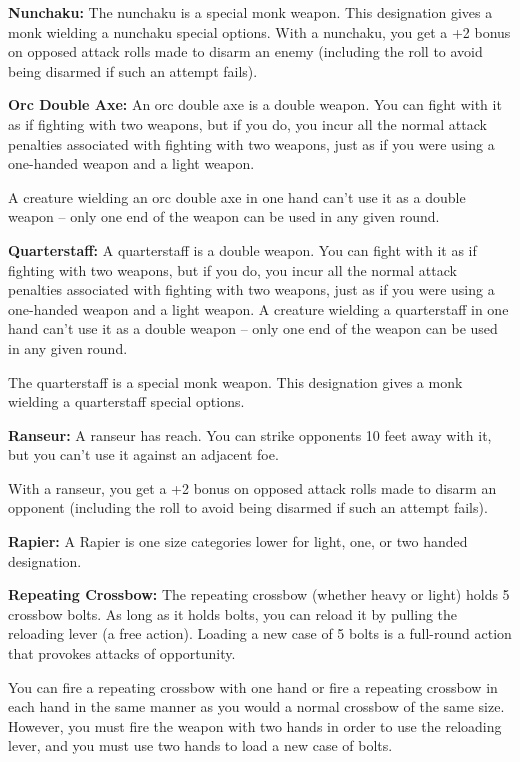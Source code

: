 \begin{multicols}{2}
\textbf{Nunchaku:} The nunchaku is a special monk weapon. This designation gives a monk wielding a nunchaku special options. With a nunchaku, you get a +2 bonus on opposed attack rolls made to disarm an enemy (including the roll to avoid being disarmed if such an attempt fails).

\textbf{Orc Double Axe:} An orc double axe is a double weapon. You can fight with it as if fighting with two weapons, but if you do, you incur all the normal attack penalties associated with fighting with two weapons, just as if you were using a one-handed weapon and a light weapon.

A creature wielding an orc double axe in one hand can't use it as a double weapon -- only one end of the weapon can be used in any given round.

\textbf{Quarterstaff:} A quarterstaff is a double weapon. You can fight with it as if fighting with two weapons, but if you do, you incur all the normal attack penalties associated with fighting with two weapons, just as if you were using a one-handed weapon and a light weapon. A creature wielding a quarterstaff in one hand can't use it as a double weapon -- only one end of the weapon can be used in any given round.

The quarterstaff is a special monk weapon. This designation gives a monk wielding a quarterstaff special options.

\textbf{Ranseur:} A ranseur has reach. You can strike opponents 10 feet away with it, but you can't use it against an adjacent foe.

With a ranseur, you get a +2 bonus on opposed attack rolls made to disarm an opponent (including the roll to avoid being disarmed if such an attempt fails).

\textbf{Rapier:} A Rapier is one size categories lower for light, one, or two handed designation.

\textbf{Repeating Crossbow:} The repeating crossbow (whether heavy or light) holds 5 crossbow bolts. As long as it holds bolts, you can reload it by pulling the reloading lever (a free action). Loading a new case of 5 bolts is a full-round action that provokes attacks of opportunity.

You can fire a repeating crossbow with one hand or fire a repeating crossbow in each hand in the same manner as you would a normal crossbow of the same size. However, you must fire the weapon with two hands in order to use the reloading lever, and you must use two hands to load a new case of bolts.


\end{multicols}
